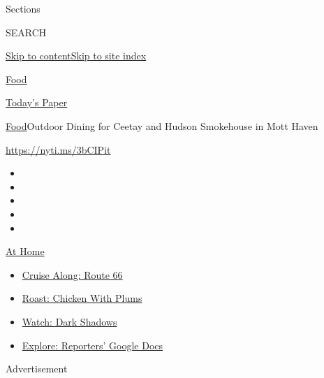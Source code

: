 Sections

SEARCH

\protect\hyperlink{site-content}{Skip to
content}\protect\hyperlink{site-index}{Skip to site index}

\href{https://www.nytimes3xbfgragh.onion/section/food}{Food}

\href{https://myaccount.nytimes3xbfgragh.onion/auth/login?response_type=cookie\&client_id=vi}{}

\href{https://www.nytimes3xbfgragh.onion/section/todayspaper}{Today's
Paper}

\href{/section/food}{Food}\textbar{}Outdoor Dining for Ceetay and Hudson
Smokehouse in Mott Haven

\url{https://nyti.ms/3bCIPit}

\begin{itemize}
\item
\item
\item
\item
\item
\end{itemize}

\href{https://www.nytimes3xbfgragh.onion/spotlight/at-home?action=click\&pgtype=Article\&state=default\&region=TOP_BANNER\&context=at_home_menu}{At
Home}

\begin{itemize}
\tightlist
\item
  \href{https://www.nytimes3xbfgragh.onion/2020/09/07/travel/route-66.html?action=click\&pgtype=Article\&state=default\&region=TOP_BANNER\&context=at_home_menu}{Cruise
  Along: Route 66}
\item
  \href{https://www.nytimes3xbfgragh.onion/2020/09/04/dining/sheet-pan-chicken.html?action=click\&pgtype=Article\&state=default\&region=TOP_BANNER\&context=at_home_menu}{Roast:
  Chicken With Plums}
\item
  \href{https://www.nytimes3xbfgragh.onion/2020/09/04/arts/television/dark-shadows-stream.html?action=click\&pgtype=Article\&state=default\&region=TOP_BANNER\&context=at_home_menu}{Watch:
  Dark Shadows}
\item
  \href{https://www.nytimes3xbfgragh.onion/interactive/2020/at-home/even-more-reporters-editors-diaries-lists-recommendations.html?action=click\&pgtype=Article\&state=default\&region=TOP_BANNER\&context=at_home_menu}{Explore:
  Reporters' Google Docs}
\end{itemize}

Advertisement

